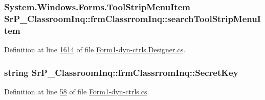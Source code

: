 \hypertarget{class_sr_p___classroom_inq_1_1frm_classrrom_inq_aa54fbd91dddb42716ec00341ee7ac713}{
\subsubsection[{search\-Tool\-Strip\-Menu\-Item}]{\setlength{\rightskip}{0pt plus 5cm}\-System.\-Windows.\-Forms.\-Tool\-Strip\-Menu\-Item {\bf \-Sr\-P\-\_\-\-Classroom\-Inq\-::frm\-Classrrom\-Inq\-::search\-Tool\-Strip\-Menu\-Item}}}
\label{class_sr_p___classroom_inq_1_1frm_classrrom_inq_aa54fbd91dddb42716ec00341ee7ac713}


\-Definition at line \hyperlink{_form1-dyn-ctrls_8_designer_8cs_source_l01614}{1614} of file \hyperlink{_form1-dyn-ctrls_8_designer_8cs_source}{\-Form1-\/dyn-\/ctrls.\-Designer.\-cs}.

\hypertarget{class_sr_p___classroom_inq_1_1frm_classrrom_inq_ae3ddacd233e71c710d89e12401af37c1}{
\subsubsection[{\-Secret\-Key}]{\setlength{\rightskip}{0pt plus 5cm}string {\bf \-Sr\-P\-\_\-\-Classroom\-Inq\-::frm\-Classrrom\-Inq\-::\-Secret\-Key}}}
\label{class_sr_p___classroom_inq_1_1frm_classrrom_inq_ae3ddacd233e71c710d89e12401af37c1}


\-Definition at line \hyperlink{_form1-dyn-ctrls_8cs_source_l00058}{58} of file \hyperlink{_form1-dyn-ctrls_8cs_source}{\-Form1-\/dyn-\/ctrls.\-cs}.

